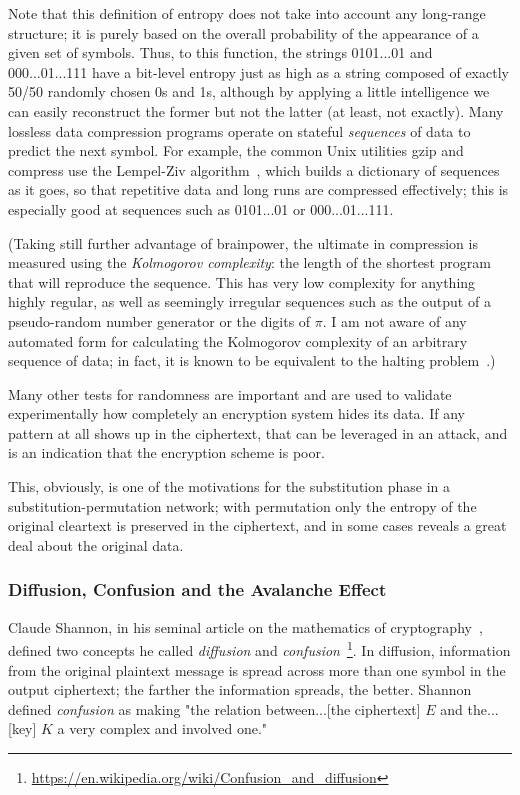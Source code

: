 Note that this definition of entropy does not take into account any
long-range structure; it is purely based on the overall probability of
the appearance of a given set of symbols.  Thus, to this function, the
strings 0101...01 and 000...01...111 have a bit-level entropy just as
high as a string composed of exactly 50/50 randomly chosen 0s and 1s,
although by applying a little intelligence we can easily reconstruct
the former but not the latter (at least, not exactly).  Many lossless
data compression programs operate on stateful \emph{sequences} of data
to predict the next symbol.  For example, the common Unix utilities
gzip and compress use the Lempel-Ziv
algorithm~\cite{compression:Ziv78}, which builds a dictionary of
sequences as it goes, so that repetitive data and long runs are
compressed effectively; this is especially good at sequences such as
0101...01 or 000...01...111.

(Taking still further advantage of brainpower, the ultimate in
compression is measured using the \emph{Kolmogorov complexity}: the
length of the shortest program that will reproduce the sequence.  This
has very low complexity for anything highly regular, as well as
seemingly irregular sequences such as the output of a pseudo-random
number generator or the digits of $\pi$.  I am not aware of any
automated form for calculating the Kolmogorov complexity of an
arbitrary sequence of data; in fact, it is known to be equivalent to
the halting problem~\cite{chaitin1975theory,chaitin1995program}.)

Many other tests for randomness are important and are used to validate
experimentally how completely an encryption system hides its data.  If
any pattern at all shows up in the ciphertext, that can be leveraged
in an attack, and is an indication that the encryption scheme is
poor.

This, obviously, is one of the motivations for the substitution phase
in a substitution-permutation network; with permutation only the
entropy of the original cleartext is preserved in the ciphertext, and
in some cases reveals a great deal about the original data.

\subsubsection{Diffusion, Confusion and the Avalanche Effect}
\label{sec:diffusion}

Claude Shannon, in his seminal article on the mathematics of
cryptography~\cite{shannon45}, defined two concepts he called
\emph{diffusion} and \emph{confusion}~\footnote{\url{https://en.wikipedia.org/wiki/Confusion_and_diffusion}}.  In diffusion, information from
the original plaintext message is spread across more than one symbol
in the output ciphertext; the farther the information spreads, the
better.  Shannon defined \emph{confusion} as making "the relation
between...[the ciphertext] $E$ and the...[key] $K$ a very complex and
involved one."

